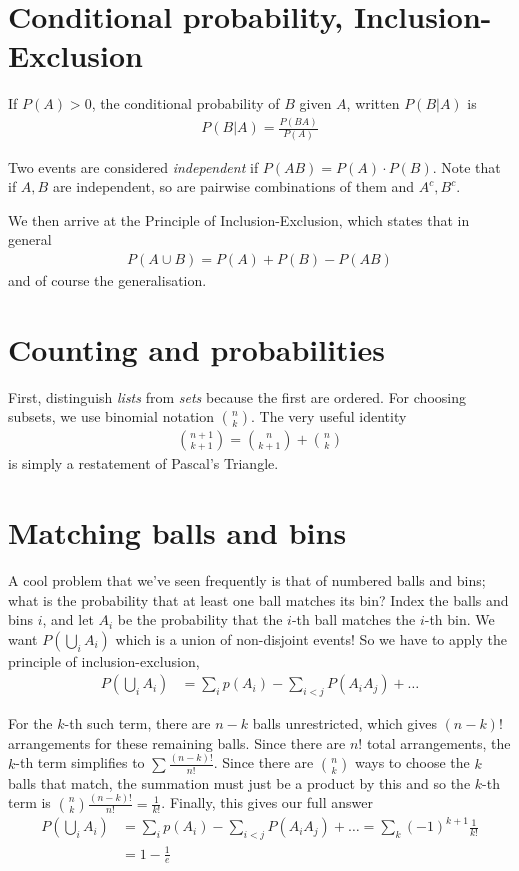 \documentclass[10pt]{report}
\begin{document}
\section{Conditional probability, Inclusion-Exclusion}

If $P(A) > 0$, the conditional probability of $B$ given $A$, written $P(B|A)$ is
\begin{align}
    P(B|A) = \frac{P(BA)}{P(A)}
\end{align}

Two events are considered \emph{independent} if $P(AB) = P(A) \cdot P(B)$. Note that if $A,B$ are independent, so are pairwise combinations of them and $A^c, B^c$. 

We then arrive at the Principle of Inclusion-Exclusion, which states that in general
\begin{align}
    P\left( A \cup B \right) = P(A) + P(B) - P(AB)
\end{align}
and of course the generalisation.

\section{Counting and probabilities}

First, distinguish \emph{lists} from \emph{sets} because the first are ordered. For choosing subsets, we use binomial notation $\binom{n}{k}$. The very useful identity
\begin{align}
    \binom{n+1}{k+1} = \binom{n}{k+1} + \binom{n}{k}
\end{align}
is simply a restatement of Pascal's Triangle.

\section{Matching balls and bins}

A cool problem that we've seen frequently is that of numbered balls and bins; what is the probability that at least one ball matches its bin? Index the balls and bins $i$, and let $A_i$ be the probability that the $i$-th ball matches the $i$-th bin. We want $P\left( \bigcup_i A_i \right)$ which is a union of non-disjoint events! So we have to apply the principle of inclusion-exclusion,
\begin{align}
    P\left( \bigcup_i A_i \right) &= \sum_i p(A_i) - \sum_{i < j} P(A_iA_j) +\dots
\end{align}

For the $k$-th such term, there are $n-k$ balls unrestricted, which gives $(n-k)!$ arrangements for these remaining balls. Since there are $n!$ total arrangements, the $k$-th term simplifies to $\sum \frac{(n-k)!}{n!}$. Since there are $\binom{n}{k}$ ways to choose the $k$ balls that match, the summation must just be a product by this and so the $k$-th term is $\binom{n}{k}\frac{(n-k)!}{n!} = \frac{1}{k!}$. Finally, this gives our full answer
\begin{align}
    P\left( \bigcup_i A_i \right) &= \sum_i p(A_i) - \sum_{i < j} P(A_iA_j) +\dots = \sum\limits_{k} \left( -1 \right)^{k+1}\frac{1}{k!}\\
    &= 1 - \frac{1}{e}
\end{align}
\end{document}
